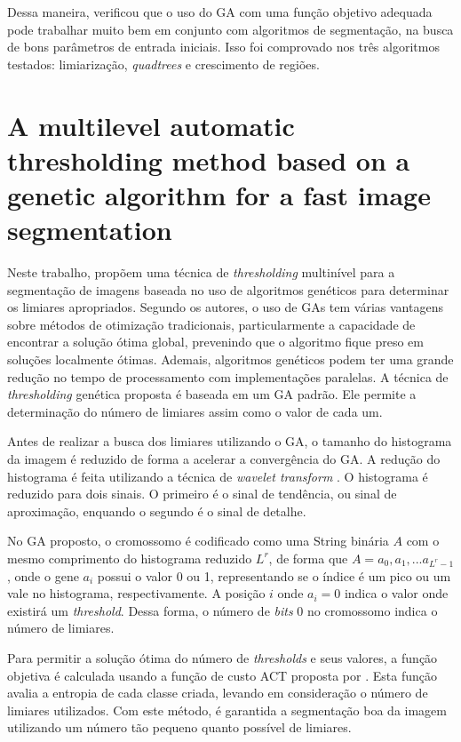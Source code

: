 \documentclass[12pt,oneside,a4paper,english,french,spanish,brazil,]{abntex2}
\begin{document}
Dessa maneira, \citet{matias:2007} verificou que o uso do GA com uma função objetivo adequada pode trabalhar muito bem em conjunto com algoritmos de segmentação, na busca de bons parâmetros de entrada iniciais. Isso foi comprovado nos três algoritmos testados: limiarização, \textit{quadtrees} e crescimento de regiões.

\section{A multilevel automatic thresholding method based on a genetic algorithm for a fast image segmentation}

Neste trabalho, \citet{hammouche:2008} propõem uma técnica de \textit{thresholding} multinível para a segmentação de imagens baseada no uso de algoritmos genéticos para determinar os limiares apropriados. Segundo os autores, o uso de GAs tem várias vantagens sobre métodos de otimização tradicionais, particularmente a capacidade de encontrar a solução ótima global, prevenindo que o algoritmo fique preso em soluções localmente ótimas. Ademais, algoritmos genéticos podem ter uma grande redução no tempo de processamento com implementações paralelas. A técnica de \textit{thresholding} genética proposta é baseada em um GA padrão. Ele permite a determinação do número de limiares assim como o valor de cada um. 

Antes de realizar a busca dos limiares utilizando o GA, o tamanho do histograma da imagem é reduzido de forma a acelerar a convergência do GA. A redução do histograma é feita utilizando a técnica de \textit{wavelet transform} \cite{kim:2003}. O histograma é reduzido para dois sinais. O primeiro é o sinal de tendência, ou sinal de aproximação, enquando o segundo é o sinal de detalhe.

No GA proposto, o cromossomo é codificado como uma String binária \(A\) com o mesmo comprimento do histograma reduzido \(L^r\), de forma que \(A = a_0, a_1, ... a_{L^r-1}\), onde o gene \(a_i\) possui o valor 0 ou 1, representando se o índice é um pico ou um vale no histograma, respectivamente. A posição \(i\) onde \(a_i = 0\) indica o valor onde existirá um \textit{threshold}. Dessa forma, o número de \textit{bits} 0 no cromossomo indica o número de limiares.

Para permitir a solução ótima do número de \textit{thresholds} e seus valores, a função objetiva é calculada usando a função de custo ACT proposta por \citet{yen:1995}. Esta função avalia a entropia de cada classe criada, levando em consideração o número de limiares utilizados. Com este método, é garantida a segmentação boa da imagem utilizando um número tão pequeno quanto possível de limiares.
\end{document}

